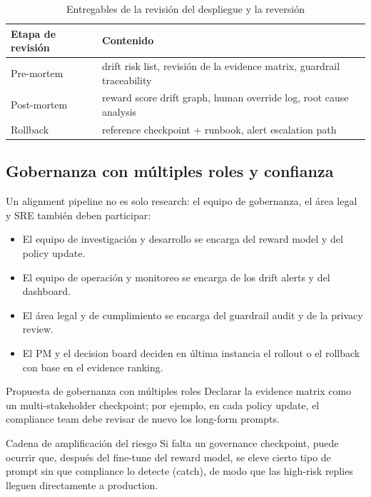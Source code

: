 \documentclass[a4paper]{article}
\begin{document}
\begin{table}[H]
\centering
\begin{tabular}{p{} p{}}
\toprule
Etapa de revisión & Contenido \\
\midrule
Pre-mortem & drift risk list, revisión de la evidence matrix, guardrail traceability \\
Post-mortem & reward score drift graph, human override log, root cause analysis \\
Rollback & reference checkpoint + runbook, alert escalation path \\
\bottomrule
\end{tabular}
\caption{Entregables de la revisión del despliegue y la reversión}
\end{table}

\subsection{Gobernanza con múltiples roles y confianza}

Un alignment pipeline no es solo research: el equipo de gobernanza, el área legal y SRE también deben participar:
\begin{itemize}
    \item El equipo de investigación y desarrollo se encarga del reward model y del policy update.
    \item El equipo de operación y monitoreo se encarga de los drift alerts y del dashboard.
    \item El área legal y de cumplimiento se encarga del guardrail audit y de la privacy review.
    \item El PM y el decision board deciden en última instancia el rollout o el rollback con base en el evidence ranking.
\end{itemize}

\begin{knowledgebox}{Propuesta de gobernanza con múltiples roles}
Declarar la evidence matrix como un multi-stakeholder checkpoint; por ejemplo, en cada policy update, el compliance team debe revisar de nuevo los long-form prompts.
\end{knowledgebox}

\begin{warningbox}{Cadena de amplificación del riesgo}
Si falta un governance checkpoint, puede ocurrir que, después del fine-tune del reward model, se eleve cierto tipo de prompt sin que compliance lo detecte (catch), de modo que las high-risk replies lleguen directamente a production.
\end{warningbox}
\end{document}
